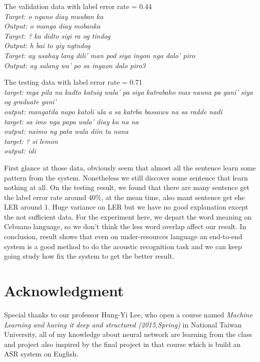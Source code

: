 \documentclass[conference]{IEEEtran}
\begin{document}
The validation data with label error rate = 0.44 \\
\it{ Target:  o ngano diay muuban ka \\
Output:  o manga diay mobanka \\
Target:  ? ka didto sigi ra og tindog \\
Output:   h bai to giy ngtndog \\
Target:  ay usahay lang dili' man pod siya ingon nga dalo' piro \\
Output:  ay salang wa' po sa ingaon dalo piro3 \\}

The testing data with label error rate = 0.71\\
\it{ target: mga pila na kadto katuig wala' pa siya katrabaho mas nauna pa gani' siya og graduate gani'\\
output: mangatila napo katoli ula a sa katrba bassawu na sa  radde nadi\\
target: sa imo nga papa wala' diay ka na na\\ 
output: naimo ng pata wala diin ta nana\\
target: ? si lemon\\ 
output: idi\\ }

First glance at those data, obviously seem that almost all the sentence learn some pattern from the system.  Nonetheless we still discover some sentence that learn nothing at all.  On the testing result, we found that there are many sentence get the label error rate around 40\%, at the mean time, also mant sentence get ehe LER around 1.  Huge variance on LER but we have no good explanation except the not sufficient data.  For the experiment here, we depart the word meaning on Cebuano language, so we don't think the less word overlap affect our result.  In conclusion, result shows that even on under-resources language an end-to-end system is a good method to do the acoustic recognition task and we can keep going study how fix the system to get the better result.  

\section*{Acknowledgment}
Special thanks to our professor Hung-Yi Lee, who open a course named {\it Machine Learning and having it deep and structured (2015,Spring)} in National Taiwan University, all of my knowledge about neural network are learning from the class and project also inspired by the final project in that course which is build an ASR system on English. 
\end{document}
